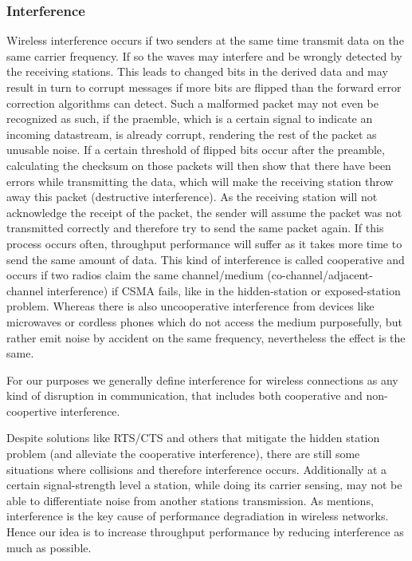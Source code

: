       \subsubsection{Interference}
	Wireless interference occurs if two senders at the same time transmit data on the same carrier frequency. If so the waves may interfere and be wrongly detected
	by the receiving stations. This leads to changed bits in the derived data and may result in turn to corrupt messages if more bits are flipped than the
	forward error correction algorithms can detect. Such a malformed packet may not even be recognized as such, if the praemble, which is a certain signal to indicate an
	incoming datastream, is already corrupt, rendering the rest of the packet as unusable noise. If a certain threshold of flipped bits occur after the preamble,
	calculating the checksum on those packets will then show that there have been errors while transmitting the data, which will make the receiving station 
	throw away this packet (destructive interference).
	As the receiving station will not acknowledge the receipt of the packet, the sender will assume the packet was not transmitted correctly and therefore try 
	to send the same packet again. If this process occurs often, throughput performance will suffer as it takes more time to send the same amount of data.
	This kind of interference is called cooperative and occurs if two radios claim the same channel/medium (co-channel/adjacent-channel interference) if CSMA fails,
	like in the hidden-station or exposed-station problem.
	Whereas there is also uncooperative interference from devices like microwaves or cordless phones which do not access the medium purposefully, but rather
	emit noise by accident on the same frequency, nevertheless the effect is the same.
	
	For our purposes we generally define interference for wireless connections as any kind of disruption in communication, 
	that includes both cooperative and non-coopertive interference.
	
	Despite solutions like RTS/CTS and others that mitigate the hidden station problem (and alleviate the cooperative interference),
	there are still some situations where collisions and therefore interference occurs.
	Additionally at a certain signal-strength level a station, while doing its carrier sensing, may not be able to differentiate noise from another stations transmission.
	As \cite{padhye2005estimation} mentions, interference is the key cause of performance degradiation in wireless networks. Hence our idea is to increase throughput 
	performance by reducing interference as much as possible.
	
